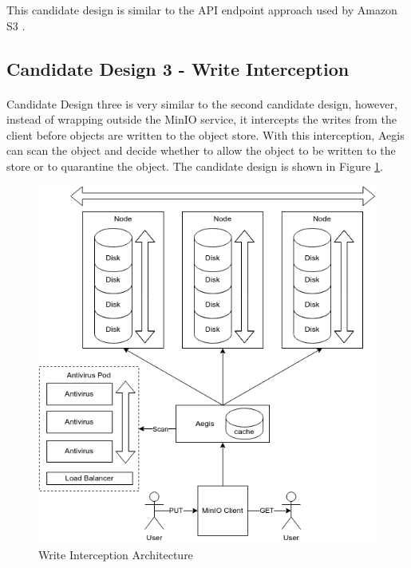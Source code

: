 \documentclass[12pt, conference, final, a4paper, onecolumn, compsoc]{IEEEtran}
\begin{document}
This candidate design is similar to the API endpoint approach used by Amazon S3
\citep{amazon-md}.

\subsection{Candidate Design 3 - Write Interception}
\paragraph{}

Candidate Design three is very similar to the second candidate design, however,
instead of wrapping outside the MinIO service, it intercepts the writes from the
client before objects are written to the object store. With this interception,
Aegis can scan the object and decide whether to allow the object to be written
to the store or to quarantine the object. The candidate design is shown in
Figure \ref{fig:writeInterceptArch}.

\pagebreak

\begin{figure}
  \centering \includegraphics[scale=.4]{diagrams/write-intercept.png}
  \caption{Write Interception Architecture}
  \label{fig:writeInterceptArch}
\end{figure}
\end{document}
